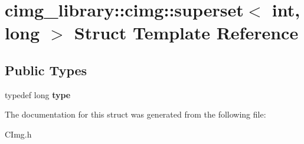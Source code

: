 \hypertarget{structcimg__library_1_1cimg_1_1superset_3_01int_00_01long_01_4}{\section{cimg\-\_\-library\-:\-:cimg\-:\-:superset$<$ int, long $>$ Struct Template Reference}
\label{structcimg__library_1_1cimg_1_1superset_3_01int_00_01long_01_4}
}
\subsection*{Public Types}
\begin{DoxyCompactItemize}
\item 
\hypertarget{structcimg__library_1_1cimg_1_1superset_3_01int_00_01long_01_4_aedae721d4eb0f25be133aa69be61ebc0}{typedef long {\bfseries type}}\label{structcimg__library_1_1cimg_1_1superset_3_01int_00_01long_01_4_aedae721d4eb0f25be133aa69be61ebc0}

\end{DoxyCompactItemize}


The documentation for this struct was generated from the following file\-:\begin{DoxyCompactItemize}
\item 
C\-Img.\-h\end{DoxyCompactItemize}
